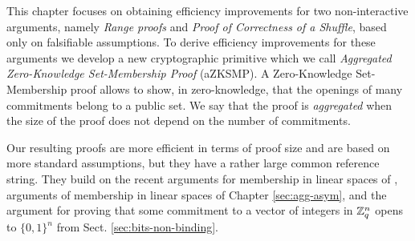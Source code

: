 This chapter focuses on obtaining efficiency improvements for two non-interactive arguments, namely \emph{Range proofs} and \emph{Proof of Correctness of a Shuffle}, based only on falsifiable assumptions.  To derive efficiency improvements for these arguments we develop a new cryptographic primitive which we call \emph{Aggregated Zero-Knowledge Set-Membership Proof} (aZKSMP). A Zero-Knowledge Set-Membership proof allows to show, in zero-knowledge, that the openings of many commitments belong to a public set. We say that the proof is \emph{aggregated} when the size of the proof does not depend on the number of commitments.

Our resulting proofs are more efficient in terms of proof size and are based on more standard assumptions, but they have a rather large common reference string. They build on the recent arguments for membership in linear spaces of \cite{EC:LPJY14,C:JutRoy14,EC:KilWee15}, arguments of membership in linear spaces of Chapter \ref{sec:agg-asym}, and the argument for proving that some commitment to a vector of integers in $\mathbb{Z}_q^{n}$ opens to $\{0,1\}^n$ from Sect. \ref{sec:bits-non-binding}.
 
